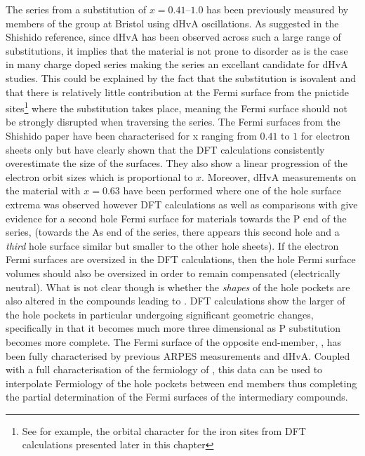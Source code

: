 The \BaFePAs series from a substitution of $x=0.41$--$1.0$ has been previously measured by members of the group at Bristol using dHvA oscillations\cite{Shishido2010}. As suggested in the Shishido reference, since dHvA has been observed across such a large range of substitutions, it implies that the material is not prone to disorder as is the case in many charge doped series  making the series an excellant candidate for dHvA studies. This could be explained by the fact that the substitution is isovalent and that there is relatively little contribution at the Fermi surface from the pnictide sites\footnote{See for example, the orbital character for the iron sites from \ac{DFT} calculations presented later in this chapter} where the substitution takes place, meaning the Fermi surface should not be strongly disrupted when traversing the series. The Fermi surfaces from the Shishido paper have been characterised for x ranging from $0.41$ to $1$ for electron sheets only but have clearly shown that the DFT calculations consistently overestimate the size of the surfaces. They also show a linear progression of the electron orbit sizes which is proportional to $x$. Moreover, dHvA measurements on the material with $x=0.63$ have been performed where one of the hole surface extrema was observed\cite{Analytis2010c} however DFT calculations as well as comparisons with \SrFeP\cite{Analytis2009} give evidence for a second hole Fermi surface for materials towards the P end of the series, (towards the As end of the series, there appears this second hole and a \textit{third} hole surface similar but smaller to the other hole sheets). If the electron Fermi surfaces are oversized in the DFT calculations, then the hole Fermi surface volumes should also be oversized in order to remain compensated (electrically neutral). What is not clear though is whether the \textit{shapes} of the hole pockets are also altered in the compounds leading to \BaFeP. DFT calculations show the larger of the hole pockets in particular undergoing significant geometric changes, specifically in that it becomes much more three dimensional as P substitution becomes more complete. The Fermi surface of the opposite end-member, \BaFeAs, has been fully characterised by previous ARPES measurements\cite{Kondo2010a} and dHvA\cite{Terashima2011, Analytis2010b}. Coupled with a full characterisation of the fermiology of \BaFeP, this data can be used to interpolate Fermiology of the hole pockets between end members thus completing the partial determination of the Fermi surfaces of the intermediary compounds.

